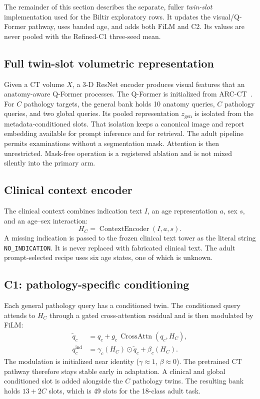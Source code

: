 \documentclass[10pt,twocolumn]{article}
\begin{document}
The remainder of this section describes the separate, fuller
\emph{twin-slot} implementation used for the Biltir exploratory rows. It
updates the visual/Q-Former pathway, uses banded age, and adds both FiLM and
C2. Its values are never pooled with the Refined-C1 three-seed mean.

\subsection{Full twin-slot volumetric representation}
Given a CT volume $X$, a 3-D ResNet encoder produces visual features that an
anatomy-aware Q-Former processes. The Q-Former is initialized from
ARC-CT~\cite{isik2026arcct}. For $C$ pathology targets, the general bank holds
10 anatomy queries, $C$ pathology queries, and two global queries. Its pooled
representation $z_{\mathrm{gen}}$ is isolated from the metadata-conditioned
slots. That isolation keeps a canonical image and report embedding available
for prompt inference and for retrieval. The adult pipeline permits
examinations without a segmentation mask. Attention is then unrestricted.
Mask-free operation is a registered ablation and is not mixed silently into
the primary arm.

\subsection{Clinical context encoder}
The clinical context combines indication text $I$, an age representation $a$,
sex $s$, and an age--sex interaction:
\begin{equation}
H_C = \operatorname{ContextEncoder}(I,a,s).
\end{equation}
A missing indication is passed to the frozen clinical text tower as the
literal string \texttt{NO\_INDICATION}. It is never replaced with fabricated
clinical text. The adult prompt-selected recipe uses six age states, one of
which is unknown.

\subsection{C1: pathology-specific conditioning}
Each general pathology query has a conditioned twin. The conditioned query
attends to $H_C$ through a gated cross-attention residual and is then
modulated by FiLM:
\begin{align}
\widetilde q_c &= q_c + g_c\,
  \operatorname{CrossAttn}(q_c,H_C),\\
q^{\mathrm{ind}}_c &= \gamma_c(H_C)\odot \widetilde q_c + \beta_c(H_C).
\end{align}
The modulation is initialized near identity ($\gamma\approx1$,
$\beta\approx0$). The pretrained CT pathway therefore stays stable early in
adaptation. A clinical and global conditioned slot is added alongside the $C$
pathology twins. The resulting bank holds $13+2C$ slots, which is 49 slots for
the 18-class adult task.
\end{document}
